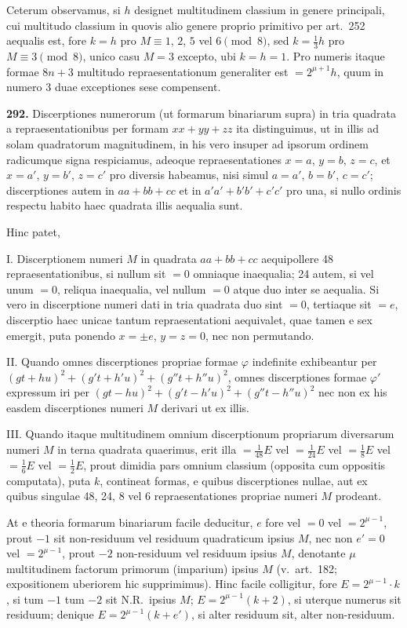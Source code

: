 \documentclass[12pt,a4paper]{article}
\theoremstyle{plain}
\theoremstyle{definition}
\theoremstyle{remark}
\begin{document}
Ceterum observamus, si $h$ designet multitudinem classium in genere principali, cui multitudo classium in quovis alio genere proprio primitivo per art.~252 aequalis est, fore $k = h$ pro $M \equiv 1$, $2$, $5$ vel $6 \pmod{8}$, sed $k = \tfrac{1}{3}h$ pro $M \equiv 3 \pmod{8}$, unico casu $M = 3$ excepto, ubi $k = h = 1$. Pro numeris itaque formae $8n+3$ multitudo repraesentationum generaliter est $= 2^{\mu+1}h$, quum in numero $3$ duae exceptiones sese compensent.

\textbf{292.} Discerptiones numerorum (ut formarum binariarum supra) in tria quadrata a repraesentationibus per formam $xx + yy + zz$ ita distinguimus, ut in illis ad solam quadratorum magnitudinem, in his vero insuper ad ipsorum ordinem radicumque signa respiciamus, adeoque repraesentationes $x=a$, $y=b$, $z=c$, et $x=a'$, $y=b'$, $z=c'$ pro diversis habeamus, nisi simul $a=a'$, $b=b'$, $c=c'$; discerptiones autem in $aa + bb + cc$ et in $a'a' + b'b' + c'c'$ pro una, si nullo ordinis respectu habito haec quadrata illis aequalia sunt.

Hinc patet,

\textsc{I.} Discerptionem numeri $M$ in quadrata $aa + bb + cc$ aequipollere 48 repraesentationibus, si nullum sit $= 0$ omniaque inaequalia; 24 autem, si vel unum $= 0$, reliqua inaequalia, vel nullum $= 0$ atque duo inter se aequalia. Si vero in discerptione numeri dati in tria quadrata duo sint $= 0$, tertiaque sit $= e$, discerptio haec unicae tantum repraesentationi aequivalet, quae tamen e sex emergit, puta ponendo $x = \pm e$, $y = z = 0$, nec non permutando.

\textsc{II.} Quando omnes discerptiones propriae formae $\varphi$ indefinite exhibeantur per $(gt + hu)^2 + (g't + h'u)^2 + (g''t + h''u)^2$, omnes discerptiones formae $\varphi'$ expressum iri per $(gt - hu)^2 + (g't - h'u)^2 + (g''t - h''u)^2$ nec non ex his easdem discerptiones numeri $M$ derivari ut ex illis.

\textsc{III.} Quando itaque multitudinem omnium discerptionum propriarum diversarum numeri $M$ in terna quadrata quaerimus, erit illa $= \tfrac{1}{48}E$ vel $= \tfrac{1}{24}E$ vel $= \tfrac{1}{8}E$ vel $= \tfrac{1}{6}E$ vel $= \tfrac{1}{2}E$, prout dimidia pars omnium classium (opposita cum oppositis computata), puta $k$, contineat formas, e quibus discerptiones nullae, aut ex quibus singulae 48, 24, 8 vel 6 repraesentationes propriae numeri $M$ prodeant.

At e theoria formarum binariarum facile deducitur, $e$ fore vel $= 0$ vel $= 2^{\mu-1}$, prout $-1$ sit non-residuum vel residuum quadraticum ipsius $M$, nec non $e' = 0$ vel $= 2^{\mu-1}$, prout $-2$ non-residuum vel residuum ipsius $M$, denotante $\mu$ multitudinem factorum primorum (imparium) ipsius $M$ (v.~art.~182; expositionem uberiorem hic supprimimus). Hinc facile colligitur, fore $E = 2^{\mu-1} \cdot k$, si tum $-1$ tum $-2$ sit N.R.~ipsius $M$; $E = 2^{\mu-1}(k+2)$, si uterque numerus sit residuum; denique $E = 2^{\mu-1}(k+e')$, si alter residuum sit, alter non-residuum.
\end{document}
